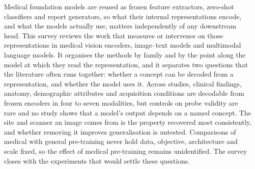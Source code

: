 Medical foundation models are reused as frozen feature extractors, zero-shot classifiers and report
generators, so what their internal representations encode, and what the models actually use, matters
independently of any downstream head. This survey reviews the work that measures or intervenes on those
representations in medical vision encoders, image--text models and multimodal language models. It
organises the methods by family and by the point along the model at which they read the representation,
and it separates two questions that the literature often runs together: whether a concept can be decoded
from a representation, and whether the model uses it. Across \Ncore{} studies, clinical findings,
anatomy, demographic attributes and acquisition conditions are decodable from frozen encoders in four to seven modalities, but controls on probe validity are rare and no study shows that a model's output
depends on a named concept. The site and scanner an image comes from is the property recovered most
consistently, and whether removing it improves generalisation is untested. Comparisons of medical with
general pre-training never hold data, objective, architecture and scale fixed, so the effect of medical
pre-training remains unidentified. The survey closes with the experiments that would settle these
questions.

